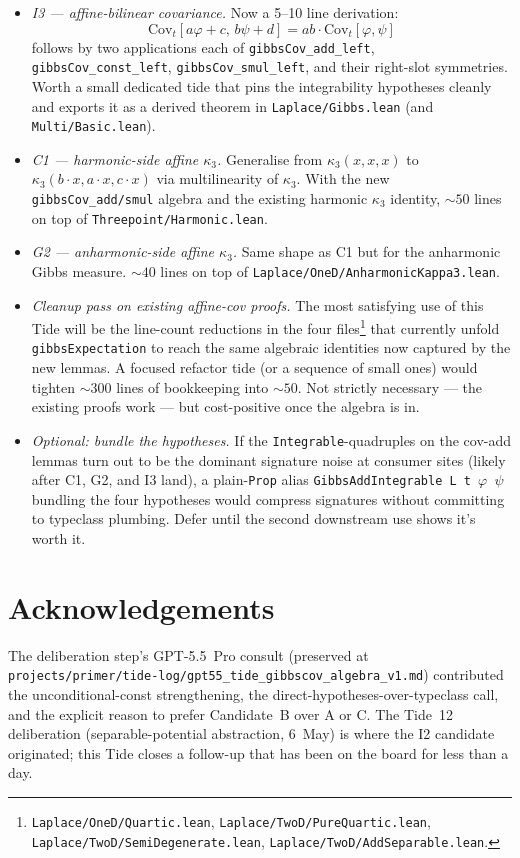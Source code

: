 \documentclass[11pt]{article}
\begin{document}
\begin{itemize}[leftmargin=*]
\item \emph{I3 — affine-bilinear covariance.} Now a 5--10 line
derivation:
\[
  \mathrm{Cov}_t[a\varphi + c, \, b\psi + d] = ab \cdot \mathrm{Cov}_t[\varphi, \psi]
\]
follows by two applications each of \texttt{gibbsCov\_add\_left},
\texttt{gibbsCov\_const\_left}, \texttt{gibbsCov\_smul\_left}, and
their right-slot symmetries. Worth a small dedicated tide that pins
the integrability hypotheses cleanly and exports it as a derived
theorem in \texttt{Laplace/Gibbs.lean} (and \texttt{Multi/Basic.lean}).

\item \emph{C1 — harmonic-side affine $\kappa_3$.} Generalise from
$\kappa_3(x, x, x)$ to $\kappa_3(b\cdot x, a\cdot x, c\cdot x)$ via
multilinearity of $\kappa_3$. With the new
\texttt{gibbsCov\_add/smul} algebra and the existing harmonic
$\kappa_3$ identity, ${\sim}50$ lines on top of
\texttt{Threepoint/Harmonic.lean}.

\item \emph{G2 — anharmonic-side affine $\kappa_3$.} Same shape as
C1 but for the anharmonic Gibbs measure. ${\sim}40$ lines on top of
\texttt{Laplace/OneD/AnharmonicKappa3.lean}.

\item \emph{Cleanup pass on existing affine-cov proofs.} The most
satisfying use of this Tide will be the line-count reductions in
the four files\footnote{\texttt{Laplace/OneD/Quartic.lean},
\texttt{Laplace/TwoD/PureQuartic.lean},
\texttt{Laplace/TwoD/SemiDegenerate.lean},
\texttt{Laplace/TwoD/AddSeparable.lean}.} that currently unfold
\texttt{gibbsExpectation} to reach the same algebraic identities now
captured by the new lemmas. A focused refactor tide (or a sequence of
small ones) would tighten ${\sim}300$ lines of bookkeeping into
${\sim}50$. Not strictly necessary — the existing proofs work — but
cost-positive once the algebra is in.

\item \emph{Optional: bundle the hypotheses.} If the
\texttt{Integrable}-quadruples on the cov-add lemmas turn out to be
the dominant signature noise at consumer sites (likely after C1, G2,
and I3 land), a plain-\texttt{Prop} alias
\texttt{GibbsAddIntegrable L t $\varphi$ $\psi$} bundling the four
hypotheses would compress signatures without committing to typeclass
plumbing. Defer until the second downstream use shows it's worth it.
\end{itemize}

\section*{Acknowledgements}

The deliberation step's GPT-5.5~Pro consult (preserved at
\texttt{projects/primer/tide-log/gpt55\_tide\_gibbscov\_algebra\_v1.md})
contributed the unconditional-const strengthening, the
direct-hypotheses-over-typeclass call, and the explicit reason to
prefer Candidate~B over A or C. The Tide~12 deliberation
(separable-potential abstraction, 6~May) is where the I2 candidate
originated; this Tide closes a follow-up that has been on the board
for less than a day.
\end{document}
